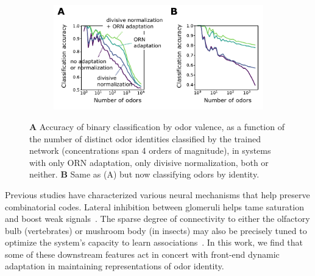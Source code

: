 \documentclass[9pt,twocolumn,twoside]{pnas-new}
\begin{document}

\begin{figure}[!t]
	\centering
	\begin{subfigure}[t]{\linewidth}
		\includegraphics[width=\textwidth]{figures/5_downstream}
		\label{fig:downstream_a}	
	\end{subfigure}
	\begin{subfigure}[t]{0\linewidth}
		\label{fig:downstream_b}
	\end{subfigure}
	\caption{\footnotesize{
	\textbf{A} Accuracy of binary classification by odor valence, as a function of the number of distinct odor identities classified by the trained network (concentrations span 4 orders of magnitude), in systems with only ORN adaptation, only divisive normalization, both or neither. \textbf{B} Same as (A) but now classifying odors  by identity.
	}}
	\label{fig:downstream}
\end{figure}


Previous studies have characterized various neural mechanisms that help preserve combinatorial codes. 
Lateral inhibition between glomeruli helps tame saturation and boost weak signals~\cite{divisive_normalization}. %
The sparse degree of connectivity to either the olfactory bulb (vertebrates) or mushroom body (in insects) %
may also be precisely tuned to optimize the system's capacity to learn associations~\cite{litwinkumar}. In this work, we find that some of these downstream features act in concert with front-end dynamic adaptation in maintaining representations of odor identity.
\end{document}
